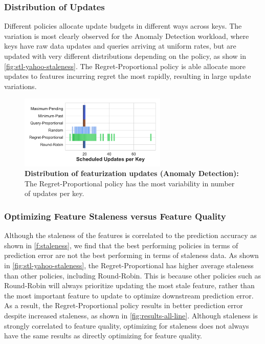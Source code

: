 \subsubsection{Distribution of Updates}
Different policies allocate update budgets in different ways across keys. The variation is most clearly observed for the Anomaly Detection workload, where keys have raw data updates and queries arriving at uniform rates, but are updated with very different distributions depending on the policy, as show in \cref{fig:stl-yahoo-staleness}. The Regret-Proportional policy is able allocate more updates to features incurring regret the most rapidly, resulting in large update variations.


\begin{figure}[t]
\begin{center}
\includegraphics[width=7cm]{ralf/figures/azure_updates_hist_tmp.pdf}
\centering
\end{center}
\caption{\textbf{Distribution of featurization updates (Anomaly Detection):} The Regret-Proportional policy has the most variability in number of updates per key.}
\label{f:update_variance}
\end{figure}

\subsubsection{Optimizing Feature Staleness versus Feature Quality}
Although the staleness of the features is correlated to the prediction accuracy as shown in \cref{f:staleness}, we find that the best performing policies in terms of prediction error are not the best performing in terms of staleness data. As shown in \cref{fig:stl-yahoo-staleness}, the Regret-Proportional has higher average staleness than other policies, including Round-Robin. This is because other policies such as Round-Robin will always prioritize updating the most stale feature, rather than the most important feature to update to optimize downstream prediction error. 
As a result, the Regret-Proportional policy results in better prediction error despite increased staleness, as shown in \cref{fig:results-all-line}. Although staleness is strongly correlated to feature quality, optimizing for staleness does not always have the same results as directly optimizing for feature quality. 

